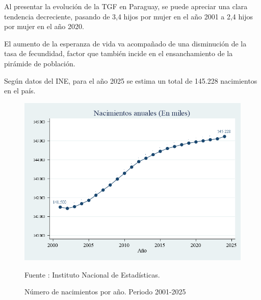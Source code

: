 Al presentar la evolución de la TGF en Paraguay, se puede apreciar una
clara tendencia decreciente, pasando de 3,4 hijos por mujer en el año
2001 a 2,4 hijos por mujer en el año 2020.

El aumento de la esperanza de vida va acompañado de una disminución de
la tasa de fecundidad, factor que también incide en el ensanchamiento de
la pirámide de población.

Según datos del INE, para el año 2025 se estima un total de 145.228
nacimientos en el país.

\begin{figure}[H]
\begin{center}
                    \caption{Número de nacimientos por año. Periodo 2001-2025}
                    \includegraphics[scale=0.45]{INEnronacanual.png}
                                    \item \footnotesize Fuente : Instituto Nacional de Estadísticas.

                    \end{center}
\end{figure}

